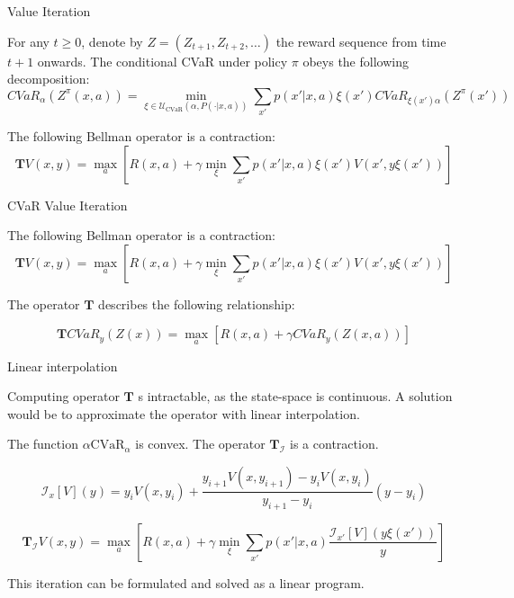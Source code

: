 \documentclass{beamer}
\newcommand{\cvar}{\text{CVaR}}
\newcommand{\envelope}{\mathcal{U}_{\cvar}(\alpha, P(\cdot | x, a))}
\newcommand{\bround}[1]{\left( {#1} \right)}
\newcommand{\bsquare}[1]{\left[ {#1} \right]}
\newcommand{\interpI}{\mathcal{I}}
\begin{document}
\begin{frame}{Value Iteration}

\begin{theorem}
For any $t\geq 0$, denote by $Z  = (Z_{t+1},Z_{t+2},\dots)$ the reward sequence from time $t+1$ onwards. The conditional CVaR under policy $\pi$ obeys the following decomposition:
$$CVaR_\alpha\bround{Z^\pi(x, a)} = \min_{\xi \in \envelope} \sum_{x'} p(x'| x, a)\xi(x') CVaR_{\xi(x')\alpha}\bround{Z^\pi(x')}$$
\end{theorem}

\begin{theorem}
The following Bellman operator is a contraction:
$$\mathbf{T}V(x, y) = \max_a \bsquare{ R(x, a) + \gamma \min_{\xi} \sum_{x'} p(x'| x, a)\xi(x') V\bround{x', y\xi(x')}}$$
\end{theorem}

\end{frame}

\begin{frame}{CVaR Value Iteration}

\begin{theorem}
The following Bellman operator is a contraction:
$$\mathbf{T}V(x, y) = \max_a \bsquare{ R(x, a) + \gamma \min_{\xi} \sum_{x'} p(x'| x, a)\xi(x') V\bround{x', y\xi(x')}}$$
\end{theorem}

\vspace{1cm}

The operator $\mathbf{T}$ describes the following relationship:

$$\mathbf{T} CVaR_y(Z(x))=\max_a \bsquare{R(x, a) + \gamma CVaR_{y}(Z(x, a))}$$

\end{frame}


\begin{frame}{Linear interpolation}

Computing operator $\mathbf{T}$ s intractable, as the state-space is continuous. A solution would be to approximate the operator with linear interpolation.

\begin{theorem}
The function $\alpha\cvar_\alpha$ is convex. The operator $\mathbf{T}_\interpI$ is a contraction.

$$\interpI_{x}[V](y)=y_iV(x,y_{i})+\frac{y_{i+1}V(x,y_{i+1})-y_iV(x,y_{i})}{y_{i+1}-y_i}(y-y_i)$$

$$\mathbf{T}_\interpI V(x, y) = \max_a \bsquare{ R(x, a) + \gamma \min_{\xi} \sum_{x'} p(x'| x, a)\dfrac{\interpI_{x'} [V](y\xi(x'))}{y}}$$

\end{theorem}

This iteration can be formulated and solved as a linear program.

\end{frame}
\end{document}
